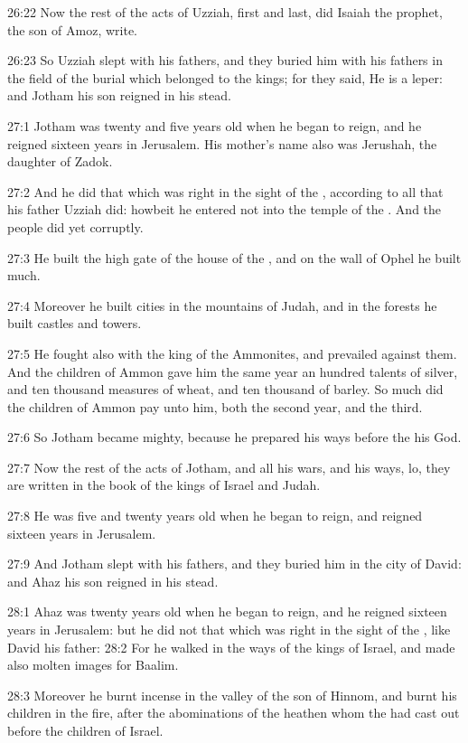 26:22 Now the rest of the acts of Uzziah, first and last, did Isaiah the prophet, the son of Amoz, write.

26:23 So Uzziah slept with his fathers, and they buried him with his fathers in the field of the burial which belonged to the kings; for they said, He is a leper: and Jotham his son reigned in his stead.

27:1 Jotham was twenty and five years old when he began to reign, and he reigned sixteen years in Jerusalem. His mother's name also was Jerushah, the daughter of Zadok.

27:2 And he did that which was right in the sight of the \LORD, according to all that his father Uzziah did: howbeit he entered not into the temple of the \LORD. And the people did yet corruptly.

27:3 He built the high gate of the house of the \LORD, and on the wall of Ophel he built much.

27:4 Moreover he built cities in the mountains of Judah, and in the forests he built castles and towers.

27:5 He fought also with the king of the Ammonites, and prevailed against them. And the children of Ammon gave him the same year an hundred talents of silver, and ten thousand measures of wheat, and ten thousand of barley. So much did the children of Ammon pay unto him, both the second year, and the third.

27:6 So Jotham became mighty, because he prepared his ways before the \LORD his God.

27:7 Now the rest of the acts of Jotham, and all his wars, and his ways, lo, they are written in the book of the kings of Israel and Judah.

27:8 He was five and twenty years old when he began to reign, and reigned sixteen years in Jerusalem.

27:9 And Jotham slept with his fathers, and they buried him in the city of David: and Ahaz his son reigned in his stead.

28:1 Ahaz was twenty years old when he began to reign, and he reigned sixteen years in Jerusalem: but he did not that which was right in the sight of the \LORD, like David his father: 28:2 For he walked in the ways of the kings of Israel, and made also molten images for Baalim.

28:3 Moreover he burnt incense in the valley of the son of Hinnom, and burnt his children in the fire, after the abominations of the heathen whom the \LORD had cast out before the children of Israel.

